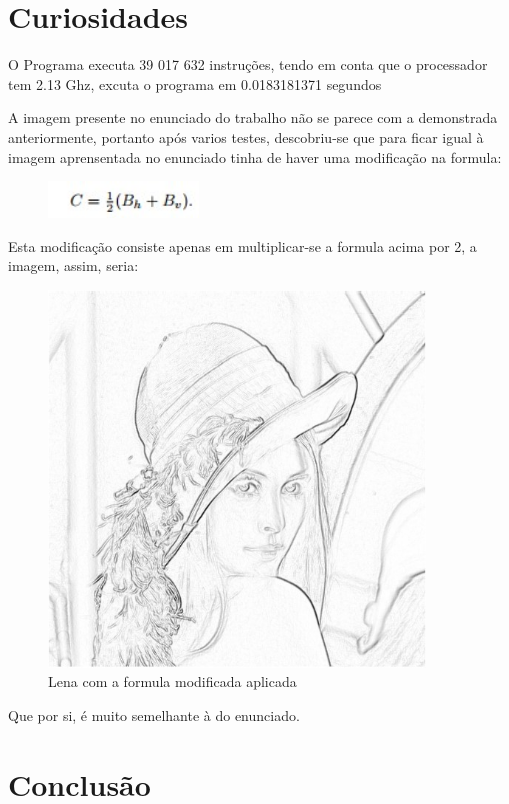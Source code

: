 \documentclass[a4paper,11pt]{article}
\begin{document}
\newpage
\section{Curiosidades}

O Programa executa 39 017 632 instruções, tendo em conta que o processador tem 2.13 Ghz, excuta o programa em 0.0183181371 segundos
\newline

A imagem presente no enunciado do trabalho não se parece com a demonstrada anteriormente, portanto após varios testes, descobriu-se que para ficar igual à imagem aprensentada no enunciado tinha de haver uma modificação na formula:

\begin{figure}[ht!]
\centering
\includegraphics[width=40mm]{formula3}
\label{overflow}
\end{figure}

Esta modificação consiste apenas em multiplicar-se a formula acima por 2, a imagem, assim, seria:

\begin{figure}[ht!]
\centering
\includegraphics[width=100mm]{Lena(final2)}
\caption{Lena com a formula modificada aplicada}
\label{overflow}
\end{figure}

Que por si, é muito semelhante à do enunciado.

\newpage
\section{Conclusão}
\end{document}
